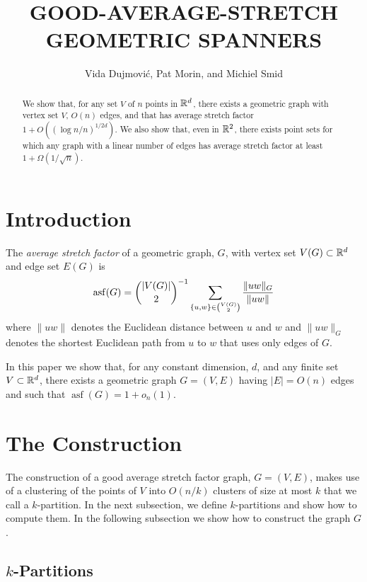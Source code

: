 \documentclass{patmorin}
\title{\MakeUppercase{Good-Average-Stretch Geometric Spanners}}
\author{Vida Dujmovi\'c, Pat Morin, and Michiel Smid}
\DeclareMathOperator{\asf}{asf}
\begin{document}
\begin{titlepage}
\maketitle

\begin{abstract}
  We show that, for any set $V$ of $n$ points in $\mathbb{R}^d$, there exists
  a geometric graph with vertex set $V$, $O(n)$ edges, and that has
  average stretch factor $1+ O((\log n/n)^{1/2d})$.
  We also show that, even in $\mathbb{R}^2$, there exists point sets for which
  any graph with a linear number of edges has average stretch factor
  at least $1+\Omega(1/\sqrt{n})$.
\end{abstract}

\end{titlepage}

\section{Introduction}

The \emph{average stretch factor} of a geometric graph, $G$, with vertex
set $V(G)\subset \mathbb{R}^d$ and edge set $E(G)$ is
\[
    \asf(G) = \binom{|V(G)|}{2}^{-1}\sum_{\{u,w\}\in\binom{V(G)}{2}}\frac{\|uw\|_G}{\|uw\|} \eqlabel{asf}
\]
where $\|uw\|$ denotes the Euclidean distance between $u$ and $w$
and $\|uw\|_G$ denotes the shortest Euclidean path from $u$ to $w$
that uses only edges of $G$.

In this paper we show that, for any constant dimension, $d$, and any
finite set $V\subset \mathbb{R}^d$, there exists a geometric graph $G=(V,E)$
having $|E|=O(n)$ edges and such that $\asf(G)=1+o_n(1)$.

\section{The Construction}

The construction of a good average stretch factor graph, $G=(V,E)$,
makes use of a clustering of the points of $V$ into $O(n/k)$ clusters of
size at most $k$ that we call a $k$-partition.  In the next subsection,
we define $k$-partitions and show how to compute them.  In the following
subsection we show how to construct the graph $G$.

\subsection{$k$-Partitions}
\end{document}
